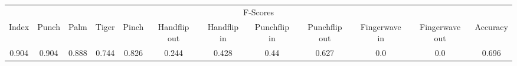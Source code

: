 \documentclass{standalone}
\begin{document}
 
 \begin{tabular}{|c|c|c|c|c|c|c|c|c|c|c ||c|}
\cline{1-12}\multicolumn{12}{|c|}{F-Scores} \\ 
\cline{1-12}Index & Punch & Palm & Tiger & Pinch & Handflip out & Handflip in & Punchflip in & Punchflip out & Fingerwave in & Fingerwave out & Accuracy\\ 
\cline{1-12}0.904 & 0.904 & 0.888 & 0.744 & 0.826 & 0.244 & 0.428 & 0.44 & 0.627 & 0.0 & 0.0 & 0.696\\ 
 \cline{1-12}\hline \end{tabular}
 
\end{document}
